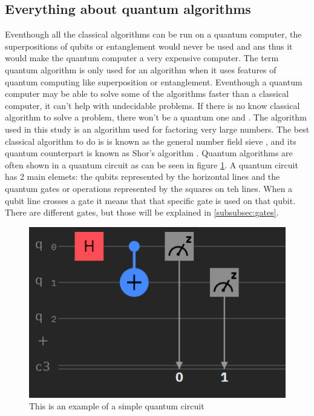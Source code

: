 \subsection{Everything about quantum algorithms}
Eventhough all the classical algorithms can be run on a quantum computer, the superpositions of qubits or entanglement would never be used \autocite{qalgo} and \autocite{quantumalgo} ans thus it would make the quantum computer a very expensive computer.
The term quantum algorithm is only used for an algorithm when it uses features of quantum computing like superposition or entanglement.
Eventhough a quantum computer may be able to solve some of the algorithms faster than a classical computer, it can't help with undecidable problems. If there is no know classical algorithm to solve a problem, there won't be a quantum one \autocite{undecidable} and \autocite{quantumalgo}.
The algorithm used in this study is an algorithm used for factoring very large numbers. The best classical algorithm to do is is known as the general number field sieve \autocite{GNFS}, and its quantum counterpart is known as Shor's algorithm \autocite{Shor}.
Quantum algorithms are often shown in a quantum circuit as can be seen in figure \ref{fig:Quantum circuit}. A quantum circuit has 2 main elemets: the qubits represented by the horizontal lines and the quantum gates or operations represented by the squares on teh lines.
When a qubit line crosses a gate it means that that specific gate is used on that qubit. There are different gates, but those will be explained in \ref{subsubsec:gates}.

\begin{figure} [h]
    \centering
    \includegraphics[width=\textwidth]{img/circuitVB.PNG}
        \caption{This is an example of a simple quantum circuit}
        \label{fig:Quantum circuit}
\end{figure}

